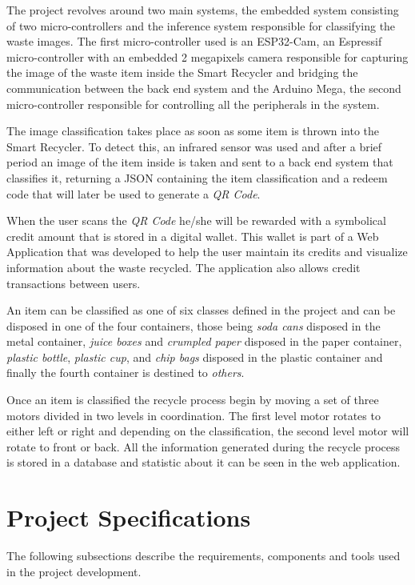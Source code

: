 \documentclass[a4paper,11pt]{article}
\begin{document}
The project revolves around two main systems, the embedded system consisting of two micro-controllers and the inference system responsible for classifying the waste images. The first micro-controller used is an ESP32-Cam, an Espressif micro-controller with an embedded 2 megapixels camera responsible for capturing the image of the waste item inside the Smart Recycler and bridging the communication between the back end system and the Arduino Mega, the second micro-controller responsible for controlling all the peripherals in the system.

The image classification takes place as soon as some item is thrown into the Smart Recycler. To detect this, an infrared sensor was used and after a brief period an image of the item inside is taken and sent to a back end system that classifies it, returning a JSON containing the item classification and a redeem code that will later be used to generate a \textit{QR Code}.

When the user scans the \textit{QR Code} he/she will be rewarded with a symbolical credit amount that is stored in a digital wallet. This wallet is part of a Web Application that was developed to help the user maintain its credits and visualize information about the waste recycled. The application also allows credit transactions between users.

An item can be classified as one of six classes defined in the project and can be disposed in one of the four containers, those being \textit{soda cans} disposed in the metal container, \textit{juice boxes} and \textit{crumpled paper} disposed in the paper container, \textit{plastic bottle}, \textit{plastic cup}, and \textit{chip bags} disposed in the plastic container and finally the fourth container is destined to \textit{others}.

Once an item is classified the recycle process begin by moving a set of three motors divided in two levels in coordination. The first level motor rotates to either left or right and depending on the classification, the second level motor will rotate to front or back. All the information generated during the recycle process is stored in a database and statistic about it can be seen in the web application.

\section{Project Specifications}
\label{sec:specification}
\noindent

The following subsections describe the requirements, components and tools used in the project development.
\end{document}
